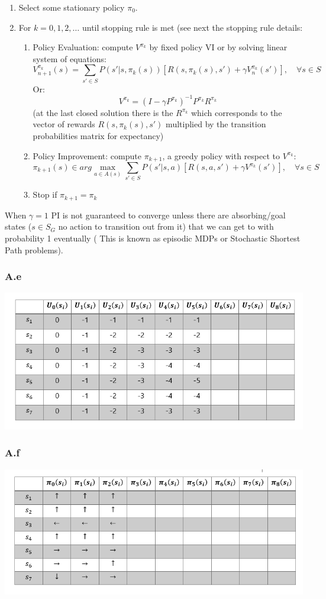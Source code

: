 \documentclass[12pt]{article}
\begin{document}
\begin{enumerate}
\item Select some stationary policy $\pi_0$.
\item For $k = 0,1,2, \ldots $ until stopping rule is met (see next the stopping rule details:
\begin{enumerate}
\item Policy Evaluation: compute $V^{\pi_k}$ by fixed policy VI or by solving linear system of equations:\\
$$V^{\pi_k}_{n + 1}(s) = \sum_{s' \in S} P(s'|s,\pi_k(s))[R(s,\pi_k(s),s') + \gamma V^{\pi_k}_n(s')], \quad \forall s \in S$$
Or:\\
$$V^{\pi_k} = (I - \gamma P^{\pi_k})^{-1} P^{\pi_k}R^{\pi_k}$$
(at the last closed solution there is the $R^{\pi_k}$ which corresponds to the vector of rewards $R(s,\pi_k(s),s')$ multiplied by the transition probabilities matrix for expectancy)
\item Policy Improvement: compute $\pi_{k+1}$, a greedy policy with respect to $V^{\pi_k}$:
$$\pi_{k+1}(s) \in arg\max_{a\in A(s)} \sum_{s' \in S} P(s'|s,a)[R(s,a,s') + \gamma V^{\pi_k}(s')], \quad \forall s \in S$$
\item Stop if $\pi_{k+1} = \pi_{k}$
\end{enumerate}
\end{enumerate}

When $\gamma=1$ PI is not guaranteed to converge unless there are absorbing/goal states ($s\in S_G$ no action to transition out from it) that we can get to with probability 1 eventually ( This is known as episodic MDPs or Stochastic Shortest Path problems).

\subsubsection*{A.e}

\includegraphics[]{hw3/plots/A_5.PNG}

\subsubsection*{A.f}

\includegraphics[]{hw3/plots/A_6.PNG}
\end{document}
